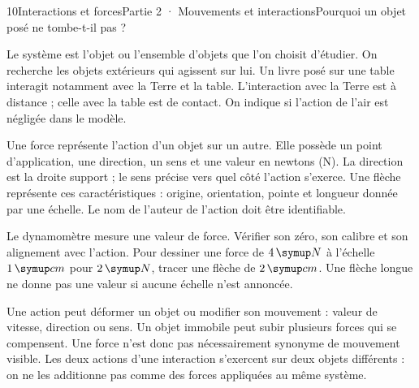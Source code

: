 \begin{ouverture}[college2]{10}{Interactions et forces}{Partie 2 · Mouvements et interactions}{Pourquoi un objet posé ne tombe-t-il pas ?}
\end{ouverture}
\label{ess-10}
Le système est l’objet ou l’ensemble d’objets que l’on choisit d’étudier. On recherche les objets extérieurs qui agissent sur lui. Un livre posé sur une table interagit notamment avec la Terre et la table. L’interaction avec la Terre est à distance ; celle avec la table est de contact. On indique si l’action de l’air est négligée dans le modèle.\par
{}
Une force représente l’action d’un objet sur un autre. Elle possède un point d’application, une direction, un sens et une valeur en newtons (N). La direction est la droite support ; le sens précise vers quel côté l’action s’exerce. Une flèche représente ces caractéristiques : origine, orientation, pointe et longueur donnée par une échelle. Le nom de l’auteur de l’action doit être identifiable.\par
\clearpage
{}
Le dynamomètre mesure une valeur de force. Vérifier son zéro, son calibre et son alignement avec l’action. Pour dessiner une force de $4\unite N$ à l’échelle $1\unite{cm}$ pour $2\unite N$, tracer une flèche de $2\unite{cm}$. Une flèche longue ne donne pas une valeur si aucune échelle n’est annoncée.\par
{}
Une action peut déformer un objet ou modifier son mouvement : valeur de vitesse, direction ou sens. Un objet immobile peut subir plusieurs forces qui se compensent. Une force n’est donc pas nécessairement synonyme de mouvement visible. Les deux actions d’une interaction s’exercent sur deux objets différents : on ne les additionne pas comme des forces appliquées au même système.\par

